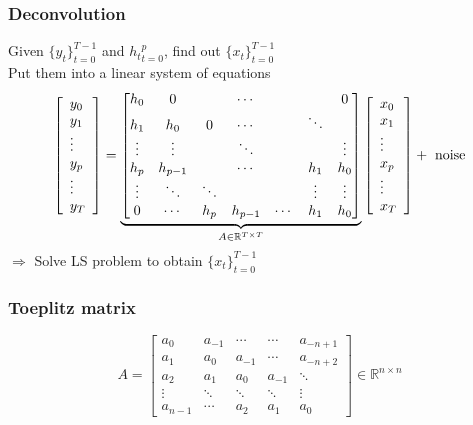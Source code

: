 \begin{multicols}{2}
\subsubsection{Deconvolution}
Given $\{y_t\}_{t=0}^{T-1}$ and ${h_t}_{t=0}^p$, find out $\{x_t\}_{t=0}^{T-1}$ \\
Put them into a linear system of equations
\[
    \left[\begin{array}{l}
        y_0 \\
        y_1 \\
        \vdots \\
        y_p \\
        \vdots \\
        y_T
    \end{array}
    \right]
    =
    \underbrace{
    \begin{bmatrix}
        h_0   & 0       &         & \cdots  &        &        &  0              \\  
        h_1   & h_0     &    0    & \cdots  &        & \ddots &                \\
        \vdots& \vdots  &         & \ddots  &        &        & \vdots         \\
        h_p   & h_{p-1} &         & \cdots  &        &h_1     & h_0            \\
        \vdots& \ddots  & \ddots  &         &        & \vdots & \vdots         \\
        0     & \cdots  & h_p     & h_{p-1} &\cdots  & h_1    & h_0
    \end{bmatrix}}_{A\in\mathbb{R}^{T\times T}}
    \left[\begin{array}{l}
        x_0 \\
        x_1 \\
        \vdots \\
        x_p \\
        \vdots \\
        x_T
    \end{array}
    \right]
    +
    \text{ \rm noise}
\]
$\Longrightarrow$ Solve LS problem to obtain $\{x_t\}_{t=0}^{T-1}$
\subsubsection{Toeplitz matrix}
\[
    A = 
    \begin{bmatrix}
        a_{0}  & a_{-1}& \cdots & \cdots & a_{-n+1}    \\
        a_{1}  & a_{0} & a_{-1} & \cdots & a_{-n+2}    \\
        a_{2}  & a_{1} & a_{0}  & a_{-1} & \ddots       \\
        \vdots & \ddots&\ddots  & \ddots & \vdots       \\
        a_{n-1}& \cdots&a_{2}   & a_{1}  & a_{0}
    \end{bmatrix}
    \in\mathbb{R}^{n\times n}
\]

\end{multicols}
